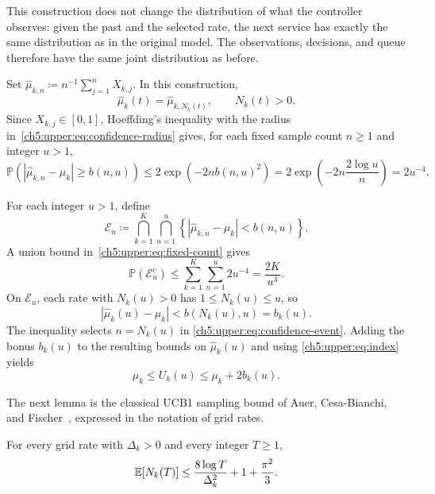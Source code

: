 This construction does not change the distribution of what the controller
observes: given the past and the selected rate, the next service has
exactly the same distribution as in the original model. The observations,
decisions, and queue therefore have the same joint distribution as before.

Set $\widehat\mu_{k,n}\coloneqq n^{-1}\sum_{j=1}^{n}X_{k,j}$. In this construction,
\[
 \widehat\mu_k(t)=\widehat\mu_{k,N_k(t)},\qquad N_k(t)>0.
\]
Since $X_{k,j}\in[0,1]$, Hoeffding's inequality with the radius
in~\eqref{ch5:upper:eq:confidence-radius} gives, for each fixed sample
count $n\ge1$ and integer $u>1$,
\begin{equation}
\mathbb P\!\left(
  |\widehat\mu_{k,n}-\mu_k|\ge b(n,u)\right)
 \le2\exp\!\left(-2n b(n,u)^2\right)
=2\exp\!\left(-2n\frac{2\log u}{n}\right)
 =2u^{-4}.
\label{ch5:upper:eq:fixed-count}
\end{equation}

For each integer $u>1$, define
\begin{equation}
 \mathcal E_u
 \coloneqq\bigcap_{k=1}^{K}\bigcap_{n=1}^{u}
 \left\{\left|\widehat\mu_{k,n}-\mu_k\right|
 <b(n,u)\right\}.
 \label{ch5:upper:eq:confidence-event}
\end{equation}
A union bound in~\eqref{ch5:upper:eq:fixed-count} gives
\begin{equation}
 \mathbb P(\mathcal E_u^c)
 \le\sum_{k=1}^K\sum_{n=1}^u 2u^{-4}
 =\frac{2K}{u^3}.
 \label{ch5:upper:eq:confidence-envelope}
\end{equation}
On $\mathcal E_u$, each rate with $N_k(u)>0$ has
$1\le N_k(u)\le u$, so
\begin{equation}
 |\widehat\mu_k(u)-\mu_k|
 <b(N_k(u),u)=b_k(u).
 \label{ch5:upper:eq:adaptive-confidence}
\end{equation}
The inequality selects $n=N_k(u)$ in
\eqref{ch5:upper:eq:confidence-event}. Adding the bonus $b_k(u)$
to the resulting bounds on $\widehat\mu_k(u)$ and using
\eqref{ch5:upper:eq:index} yields
\begin{equation}
 \mu_k\le U_k(u)\le\mu_k+2b_k(u).
 \label{ch5:upper:eq:index-envelope}
\end{equation}

The next lemma is the classical UCB1 sampling bound of Auer,
Cesa-Bianchi, and Fischer~\cite[proof of Theorem~1]{Auer2002FinitetimeAO},
expressed in the notation of grid rates.

\begin{Thm:Lemma}
\label{ch5:upper:lem:counts}
For every grid rate with $\Delta_k>0$ and every integer $T\ge1$,
\begin{equation}
 \mathbb{E}[N_k(T)]\le\frac{8\log T}{\Delta_k^2}
 +1+\frac{\pi^2}{3}.
 \label{ch5:upper:eq:counts}
\end{equation}
\end{Thm:Lemma}

